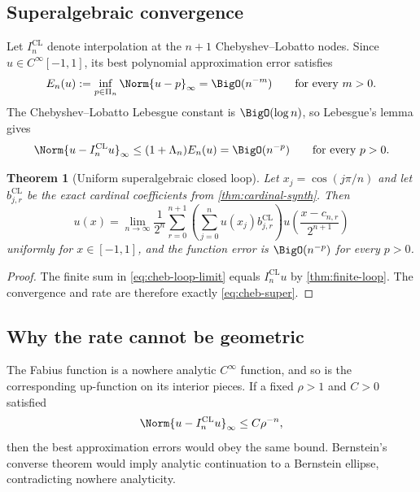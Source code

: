 \documentclass[11pt,oneside]{article}
\newtheorem{theorem}{Theorem}[section]
\theoremstyle{definition}
\theoremstyle{remark}
\newcommand{\1}{\mathbf{1}}
\begin{document}
\subsection{Superalgebraic convergence}

Let $I_n^{\mathrm{CL}}$ denote interpolation at the $n+1$
Chebyshev--Lobatto nodes.  Since $u\in C^\infty[-1,1]$, its best polynomial
approximation error satisfies
\begin{equation}
 E_n(u):=\inf_{p\in\Pi_n}\Norm{u-p}_\infty
 =\BigO(n^{-m})
 \qquad\text{for every }m>0.
 \label{eq:best-super}
\end{equation}
The Chebyshev--Lobatto Lebesgue constant is $\BigO(\log n)$, so Lebesgue's
lemma gives \cite{BerrutTrefethen2004,Trefethen2013,RepresentationRepo}
\begin{equation}
 \Norm{u-I_n^{\mathrm{CL}}u}_\infty
 \le(1+\Lambda_n)E_n(u)=\BigO(n^{-p})
 \qquad\text{for every }p>0.
 \label{eq:cheb-super}
\end{equation}

\begin{theorem}[Uniform superalgebraic closed loop]
\label{thm:cheb-loop}
Let $x_j=\cos(j\pi/n)$ and let $b_{j,r}^{\mathrm{CL}}$ be the exact cardinal
coefficients from \cref{thm:cardinal-synth}.  Then
\begin{equation}
 u(x)=\lim_{n\to\infty}\frac1{2^n}\sum_{r=0}^{n+1}
 \left(\sum_{j=0}^nu(x_j)b_{j,r}^{\mathrm{CL}}\right)
 u\!\left(\frac{x-c_{n,r}}{2^{n+1}}\right)
 \label{eq:cheb-loop-limit}
\end{equation}
uniformly for $x\in[-1,1]$, and the function error is
$\BigO(n^{-p})$ for every $p>0$.
\end{theorem}

\begin{proof}
The finite sum in \eqref{eq:cheb-loop-limit} equals
$I_n^{\mathrm{CL}}u$ by \cref{thm:finite-loop}.  The convergence and rate are
therefore exactly \eqref{eq:cheb-super}.
\end{proof}

\subsection{Why the rate cannot be geometric}

The Fabius function is a nowhere analytic $C^\infty$ function, and so is the
corresponding up-function on its interior pieces.  If a fixed $\rho>1$ and
$C>0$ satisfied
\[
 \Norm{u-I_n^{\mathrm{CL}}u}_\infty\le C\rho^{-n},
\]
then the best approximation errors would obey the same bound.  Bernstein's
converse theorem would imply analytic continuation to a Bernstein ellipse,
contradicting nowhere analyticity.
\end{document}
